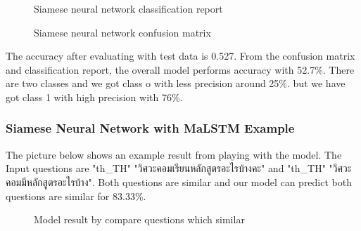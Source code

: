 \documentclass[12pt,oneside,openright,a4paper]{cpe-english-project}
\begin{document}
\begin{figure}[!h]\centering
{}
\caption{Siamese neural network classification report}\label{fig:siam_classification_report}
\end{figure}
\begin{figure}[!h]\centering
{}
\caption{Siamese neural network confusion matrix}\label{fig:siam_confusion_matrix}
\end{figure}

The accuracy after evaluating with test data is 0.527. From the confusion matrix and classification report, the overall model performs accuracy with 52.7\%. There are two classes and we got class o with less precision around 25\%. but we have got class 1 with high precision with 76\%.

\subsubsection{Siamese Neural Network with MaLSTM Example}

The picture below shows an example result from playing with the model. The Input questions are
{
\XeTeXlinebreaklocale "th_TH"	
\thaifont 
"วิศวะคอมเรียนหลักสูตรอะไรบ้างคะ" }
and
{
\XeTeXlinebreaklocale "th_TH"	
\thaifont 
"วิศวะคอมมีหลักสูตรอะไรบ้าง". 
}Both questions are similar and our model can predict both questions are similar for 83.33\%.

\begin{figure}[!h]\centering
{}
\caption{Model result by compare questions which similar}\label{fig:siam_example}
\end{figure}
\end{document}
